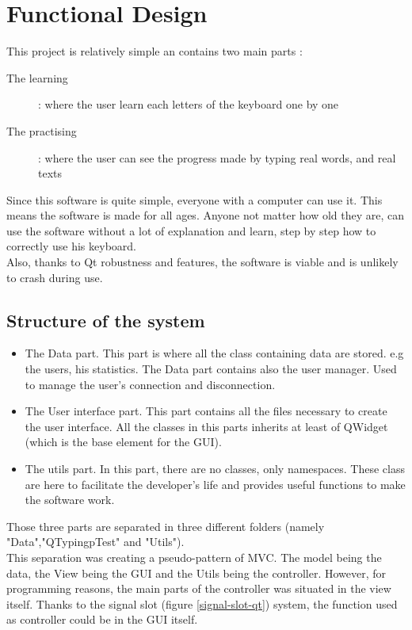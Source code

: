 \chapter{Functional Design}
This project is relatively simple an contains two main parts :
\begin{description}
	\item[The learning] : where the user learn each letters of the keyboard one by one
	\item[The practising] : where the user can see the progress made by typing real words, and real texts
\end{description}
Since this software is quite simple, everyone with a computer can use it. This means the software is made for all ages. Anyone not matter how old they are, can use the software without a lot of explanation and learn, step by step how to correctly use his keyboard.\\
Also, thanks to Qt robustness and features, the software is viable and is unlikely to crash during use.

\section{Structure of the system}

\begin{itemize}
	\item The Data part. This part is where all the class containing data are stored. e.g the users, his statistics. The Data part contains also the user manager. Used to manage the user's connection and disconnection.
	\item The User interface part. This part contains all the files necessary to create the user interface. All the classes in this parts inherits at least of QWidget (which is the base element for the GUI).
	\item The utils part. In this part, there are no classes, only namespaces. These class are here to facilitate the developer's life and provides useful functions to make the software work.  
\end{itemize}

Those three parts are separated in three different folders (namely "Data","QTypingpTest" and "Utils").\\
This separation was creating a pseudo-pattern of MVC. The model being the data, the View being the GUI and the Utils being the controller. However, for programming reasons, the main parts of the controller was situated in the view itself. Thanks to the signal slot (figure \ref{signal-slot-qt}) system, the function used as controller could be in the GUI itself.


